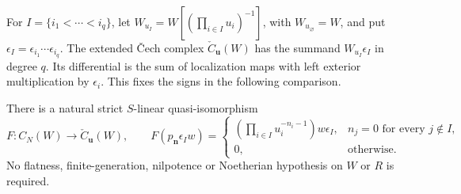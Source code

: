 For \(I=\{i_1<\cdots<i_q\}\), let
\(W_{u_I}=W[(\prod_{i\in I}u_i)^{-1}]\), with
\(W_{u_\varnothing}=W\), and put
\(\epsilon_I=\epsilon_{i_1}\cdots\epsilon_{i_q}\).
The extended \v{C}ech complex
\(\check C_{\boldsymbol u}(W)\) has the summand
\(W_{u_I}\epsilon_I\) in degree \(q\).
Its differential is the sum of localization maps with left exterior
multiplication by \(\epsilon_i\).  This fixes the signs in the
following comparison.

\begin{theorem}\label{ns:thm:cech}
There is a natural strict \(S\)-linear quasi-isomorphism
\begin{equation}\label{ns:eq:cech-map}
 F:C_N(W)\longrightarrow\check C_{\boldsymbol u}(W),\qquad
 F(p_{\boldsymbol n}\epsilon_I w)=
 \begin{cases}
  \displaystyle\left(\prod_{i\in I}u_i^{-n_i-1}\right)w\epsilon_I,
       &n_j=0\text{ for every }j\notin I,\\[2pt]
  0,&\text{otherwise}.
 \end{cases}
\end{equation}
No flatness, finite-generation, nilpotence or Noetherian hypothesis
on \(W\) or \(R\) is required.
\end{theorem}

